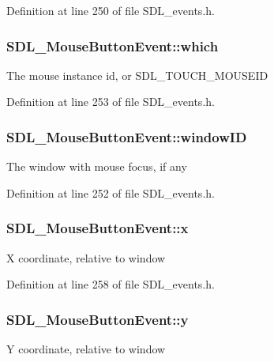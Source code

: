 Definition at line 250 of file S\-D\-L\-\_\-events.\-h.

\hypertarget{struct_s_d_l___mouse_button_event_a366aef59a0f393afc8a3561e741825df}{
\subsubsection[{which}]{ S\-D\-L\-\_\-\-Mouse\-Button\-Event\-::which}}\label{struct_s_d_l___mouse_button_event_a366aef59a0f393afc8a3561e741825df}
The mouse instance id, or S\-D\-L\-\_\-\-T\-O\-U\-C\-H\-\_\-\-M\-O\-U\-S\-E\-I\-D 

Definition at line 253 of file S\-D\-L\-\_\-events.\-h.

\hypertarget{struct_s_d_l___mouse_button_event_ab3b855d4b543b5d02fcf5d56e4421393}{
\subsubsection[{window\-I\-D}]{ S\-D\-L\-\_\-\-Mouse\-Button\-Event\-::window\-I\-D}}\label{struct_s_d_l___mouse_button_event_ab3b855d4b543b5d02fcf5d56e4421393}
The window with mouse focus, if any 

Definition at line 252 of file S\-D\-L\-\_\-events.\-h.

\hypertarget{struct_s_d_l___mouse_button_event_a5bb9c61b86e999f58637511e32e3a076}{
\subsubsection[{x}]{ S\-D\-L\-\_\-\-Mouse\-Button\-Event\-::x}}\label{struct_s_d_l___mouse_button_event_a5bb9c61b86e999f58637511e32e3a076}
X coordinate, relative to window 

Definition at line 258 of file S\-D\-L\-\_\-events.\-h.

\hypertarget{struct_s_d_l___mouse_button_event_a7ccb5c55a7ddadce723f4ea6d5269540}{
\subsubsection[{y}]{ S\-D\-L\-\_\-\-Mouse\-Button\-Event\-::y}}\label{struct_s_d_l___mouse_button_event_a7ccb5c55a7ddadce723f4ea6d5269540}
Y coordinate, relative to window 


